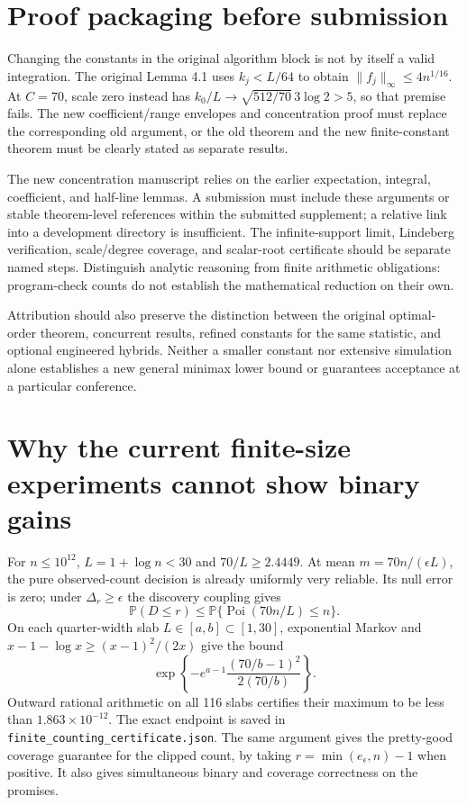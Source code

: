 \documentclass[11pt]{article}
\newcommand{\Prb}{\mathbb P}
\begin{document}
\section{Proof packaging before submission}
Changing the constants in the original algorithm block is not by itself
a valid integration. The original Lemma 4.1 uses $k_j<L/64$ to obtain
$\|f_j\|_\infty\le4n^{1/16}$. At $C=70$, scale zero instead has
$k_0/L\to\sqrt{512/70}\,3\log2>5$, so that premise fails.
The new coefficient/range envelopes and concentration proof must replace
the corresponding old argument, or the old theorem and the new
finite-constant theorem must be clearly stated as separate results.

The new concentration manuscript relies on the earlier expectation,
integral, coefficient, and half-line lemmas. A submission must include
these arguments or stable theorem-level references within the submitted
supplement; a relative link into a development directory is insufficient.
The infinite-support limit, Lindeberg verification, scale/degree coverage,
and scalar-root certificate should be separate named steps. Distinguish
analytic reasoning from finite arithmetic obligations: program-check counts
do not establish the mathematical reduction on their own.

Attribution should also preserve the distinction between the original
optimal-order theorem, concurrent results, refined constants for the same
statistic, and optional engineered hybrids. Neither a smaller constant
nor extensive simulation alone establishes a new general minimax lower
bound or guarantees acceptance at a particular conference.

\section{Why the current finite-size experiments cannot show binary gains}
For $n\le10^{12}$, $L=1+\log n<30$ and $70/L\ge2.4449$.
At mean $m=70n/(\epsilon L)$, the pure observed-count decision is already
uniformly very reliable. Its null error is zero; under $\Delta_r\ge\epsilon$
the discovery coupling gives
\[
\Prb(D\le r)\le\Prb\{\operatorname{Poi}(70n/L)\le n\}.
\]
On each quarter-width slab $L\in[a,b]\subset[1,30]$, exponential Markov
and $x-1-\log x\ge(x-1)^2/(2x)$ give the bound
\[
\exp\left\{-e^{a-1}\frac{(70/b-1)^2}{2(70/b)}\right\}.
\]
Outward rational arithmetic on all 116 slabs certifies their maximum to
be less than $1.863\times10^{-12}$. The exact endpoint is saved in
\texttt{finite\_counting\_certificate.json}. The same argument gives
the pretty-good coverage guarantee for the clipped count, by taking
$r=\min(e_\epsilon,n)-1$ when positive. It also gives simultaneous binary
and coverage correctness on the promises.
\end{document}
